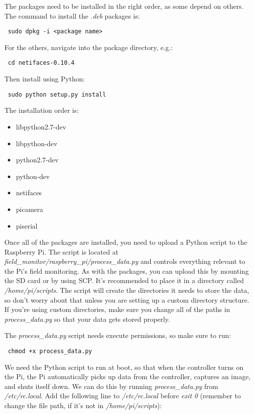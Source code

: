 \documentclass[10pt]{article}
\begin{document}
The packages need to be installed in the right order, as some depend on others. The command to install the \textit{.deb} packages is:

\begin{verbatim}
 sudo dpkg -i <package name>
\end{verbatim}

For the others, navigate into the package directory, e.g.:

\begin{verbatim}
 cd netifaces-0.10.4
\end{verbatim}

Then install using Python:

\begin{verbatim}
 sudo python setup.py install
\end{verbatim}

The installation order is:

\begin{itemize}
 \item libpython2.7-dev
 \item libpython-dev 
 \item python2.7-dev 
 \item python-dev 
 \item netifaces
 \item picamera
 \item piserial
\end{itemize}

Once all of the packages are installed, you need to upload a Python script to the Raspberry Pi. The script is located at
\textit{field\_monitor/raspberry\_pi/process\_data.py} and controls everything relevant to the Pi's field monitoring. As with the packages, you can upload this by
mounting the SD card or by using SCP. It's recommended to place it in a directory called \textit{/home/pi/scripts}. The script will create the directories it needs to store the data, so don't worry about that unless you are setting up a custom directory structure. If you're using custom directories, make sure you change all of the paths in \textit{process\_data.py} so that your data gets stored properly.

The \textit{process\_data.py} script needs execute permissions, so make sure to run:

\begin{verbatim}
 chmod +x process_data.py
\end{verbatim}

We need the Python script to run at boot, so that when the controller turns on the Pi, the Pi automatically picks up data from the controller, captures an
image, and shuts itself down. We can do this by running \textit{process\_data.py} from \textit{/etc/rc.local}. Add the following line to \textit{/etc/rc.local} before
\textit{exit 0} (remember to change the file path, if it's not in \textit{/home/pi/scripts}):
\end{document}
